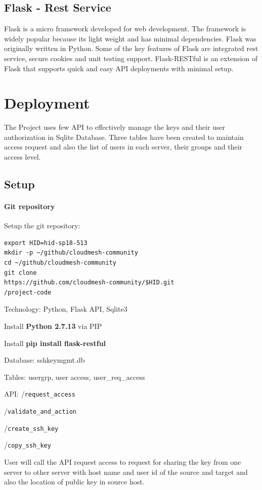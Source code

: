 \subsection{Flask - Rest Service}
Flask is a micro framework developed for web development. The 
framework is widely popular because its light weight and has 
minimal dependencies. Flask was originally written in Python. 
Some of the key features of Flask are integrated rest service,
secure cookies and unit testing support. Flask-RESTful is an
extension of Flask that supports quick and easy API
deployments with minimal setup. 

\section{Deployment}
The Project uses few API to effectively manage the keys and their
user authorization in Sqlite Database.
Three tables have been created to maintain access request and also
the list of users in each server, their groups and their access level.

\subsection{Setup}
\paragraph{Git repository}
Setup the git repository:
\begin{verbatim}
export HID=hid-sp18-513 
mkdir -p ~/github/cloudmesh-community
cd ~/github/cloudmesh-community 
git clone
https://github.com/cloudmesh-community/$HID.git
/project-code
\end{verbatim}

Technology: Python, Flask API, Sqlite3

Install \textbf{Python 2.7.13} via PIP

Install \textbf{pip install flask-restful} 


Database: sshkeymgmt.db 

Tables: usergrp, user access, user\_req\_access 

API: 
    /\verb|request_access|

    /\verb|validate_and_action|

    /\verb|create_ssh_key|

    /\verb|copy_ssh_key|

User will call the API request access to request for sharing 
the key from one server to other server with host name and 
user id of the source and target and also the location of 
public key in source host.

